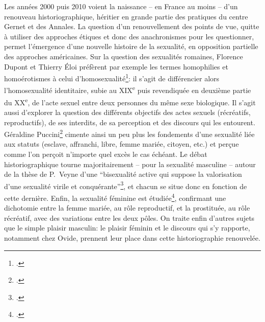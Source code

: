 Les années 2000 puis 2010 voient la naissance -- en France au moins -- d'un renouveau historiographique, héritier en grande partie des pratiques du centre Gernet et des Annales. La question d'un renouvellement des points de vue, quitte à utiliser des approches étiques et donc des anachronismes pour les questionner, permet l'émergence d'une nouvelle histoire de la sexualité, en opposition partielle des approches américaines. Sur la question des sexualités romaines, Florence Dupont et Thierry Éloi préfèrent par exemple les termes homophilies et homoérotismes à celui d'homosexualité\footcite{dupont_antiquite_2013}: il s'agit de différencier alors l'homosexualité identitaire, subie au XIX\textsuperscript{e} puis revendiquée en deuxième partie du XX\textsuperscript{e}, de l'acte sexuel entre deux personnes du même sexe biologique. Il s'agit aussi d'explorer la question des différents objectifs des actes sexuels (récréatifs, reproductifs), de ses interdits, de sa perception et des discours qui les entourent. Géraldine Puccini\footcite{puccini_delbey_vie_2010} cimente ainsi un peu plus les fondements d'une sexualité liée aux statuts (esclave, affranchi, libre, femme mariée, citoyen, etc.) et perçue comme l'on perçoit n'importe quel excès le cas échéant. Le débat historiographique tourne majoritairement -- pour la sexualité masculine -- autour de la thèse de P.~Veyne d'une \enquote{bisexualité active qui suppose la valorisation d'une sexualité virile et conquérante}\footcite[p.~20]{puccini_delbey_vie_2010}, et chacun se situe donc en fonction de cette dernière. Enfin, la sexualité féminine est étudiée\footcite{girod_les_2013}, confirmant une dichotomie entre la femme mariée, au rôle reproductif, et la prostituée, au rôle récréatif, avec des variations entre les deux pôles. On traite enfin d'autres sujets que le simple plaisir masculin: le plaisir féminin et le discours qui s'y rapporte, notamment chez Ovide, prennent leur place dans cette historiographie renouvelée.

